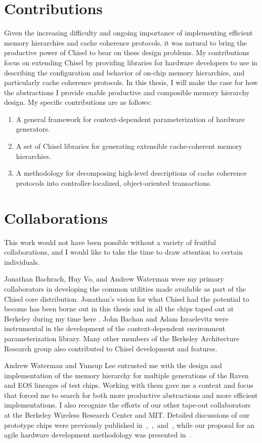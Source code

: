 \section{Contributions}

Given the increasing difficulty and ongoing importance of implementing efficient memory hierarchies and cache coherence protocols, it was natural to bring the productive power of Chisel to bear on these design problems.
My contributions focus on extending Chisel by providing libraries for hardware developers to use in describing the configuration and behavior of on-chip memory hierarchies, and particularly cache coherence protocols.
In this thesis, I will make the case for how the abstractions I provide enable productive and composible memory hierarchy design.
My specific contributions are as follows:

\begin{enumerate}
\item A general framework for context-dependent parameterization of hardware generators.
\item A set of Chisel libraries for generating extensible cache-coherent memory hierarchies.
\item A methodology for decomposing high-level descriptions of cache coherence protocols into controller-localized, object-oriented transactions.
\end{enumerate}

\section{Collaborations}

This work would not have been possible without a variety of fruitful collaborations, and I would like to take the time to draw attention to certain individuals.

Jonathan Bachrach, Huy Vo, and Andrew Waterman were my primary collaborators in developing the common utilities made available as part of the Chisel core distribution.
Jonathan's vision for what Chisel had the potential to become has been borne out in this thesis and in all the chips taped out at Berkeley during my time here \cite{chisel}.
John Bachan and Adam Izraelevitz were instrumental in the development of the context-dependent environment parameterization library.
Many other members of the Berkeley Architecture Research group also contributed to Chisel development and features. 

Andrew Waterman and Yunsup Lee entrusted me with the design and implementation of the memory hierarchy for multiple generations of the Raven and EOS lineages of test chips.
Working with them gave me a context and focus that forced me to search for both more productive abstractions and more efficient implementations.
I also recognize the efforts of our other tape-out collaborators at the Berkeley Wireless Research Center and MIT.
Detailed discussions of our prototype chips were previously published
in~\cite{lee2014eos},~\cite{zimmer2015raven},~and~\cite{sun-eos22-nature2015},
while our proposal for an agile hardware development methodology was presented in~\cite{lee-micro15}.
